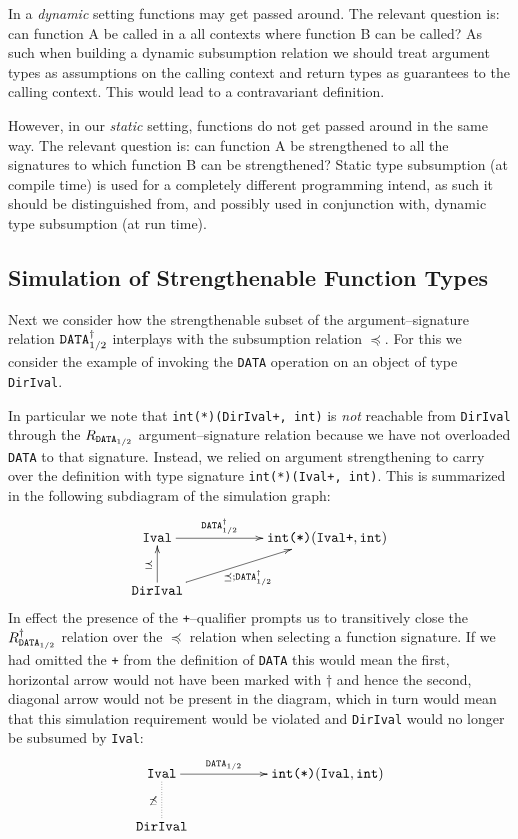 \documentclass{sigplanconf}
\newcommand{\mt}[1]{\text{\tt #1}}
\begin{document}
In a \emph{dynamic} setting functions may get passed around.  The
relevant question is: can function A be called in a all contexts where
function B can be called? As such when building a dynamic subsumption
relation we should treat argument types as assumptions on the calling
context and return types as guarantees to the calling context. This
would lead to a contravariant definition.

However, in our \emph{static} setting, functions do not get passed
around in the same way. The relevant question is: can function A be
strengthened to all the signatures to which function B can be
strengthened? Static type subsumption (at compile time) is used for a
completely different programming intend, as such it should be
distinguished from, and possibly used in conjunction with, dynamic
type subsumption (at run time).

\subsection{Simulation of Strengthenable Function Types}

Next we consider how the strengthenable subset of the
argument--signature relation $\mt{DATA}^\dagger_{1/2}$ interplays with
the subsumption relation $\preceq$. For this we consider the example
of invoking the \verb+DATA+ operation on an object of type
\verb+DirIval+.

In particular we note that \verb-int(*)(DirIval+, int)- is \emph{not}
reachable from \verb+DirIval+ through the $R_{\mt{DATA}_{1/2}}$
argument--signature relation because we have not overloaded
\verb+DATA+ to that signature. Instead, we relied on argument
strengthening to carry over the definition with type signature
\verb-int(*)(Ival+, int)-. This is summarized in the following
subdiagram of the simulation graph:
\begin{align*}
\xymatrix{
  \mt{Ival} \ar@{<-}[d]_{\preceq} \ar@{->}[rr]^-{\mt{DATA}^\dagger_{1/2}} 
  & & \mt{int(*)}(\mt{Ival+}, \mt{int}) \\
  \mt{DirIval} \ar@{->}[rru]_-{\preceq ; \mt{DATA}^\dagger_{1/2}} 
}
\end{align*}
In effect the presence of the \verb-+---qualifier prompts us to
transitively close the $R_{\mt{DATA}_{1/2}}^\dagger$ relation over the
$\preceq$ relation when selecting a function signature. If we had
omitted the \verb-+- from the definition of \verb+DATA+ this would
mean the first, horizontal arrow would not have been marked with
$\dagger$ and hence the second, diagonal arrow would not be present in
the diagram, which in turn would mean that this simulation requirement
would be violated and \verb+DirIval+ would no longer be subsumed by
\verb+Ival+:
\begin{align*}
\xymatrix{
  \mt{Ival} \ar@{..}[d]_{\not\preceq} \ar@{->}[rr]^-{\mt{DATA}_{1/2}} 
  & & \mt{int(*)}(\mt{Ival}, \mt{int}) \\
  \mt{DirIval}
}
\end{align*}
\end{document}
